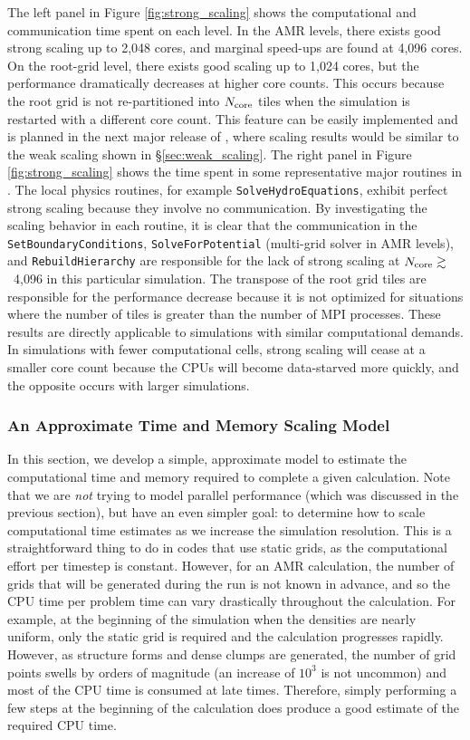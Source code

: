 The left panel in Figure \ref{fig:strong_scaling} shows the
computational and communication time spent on each level.  In the AMR
levels, there exists good strong scaling up to 2,048 cores, and
marginal speed-ups are found at 4,096 cores.  On the root-grid level,
there exists good scaling up to 1,024 cores, but the performance
dramatically decreases at higher core counts.  This occurs because the
root grid is not re-partitioned into $N_{\rm core}$ tiles when the
simulation is restarted with a different core count.  This feature can
be easily implemented and is planned in the next major release of
\enzo, where scaling results would be similar to the weak scaling shown
in \S\ref{sec:weak_scaling}.  The right panel in Figure
\ref{fig:strong_scaling} shows the time spent in some representative
major routines in \enzo.  The local physics routines, for example
\texttt{SolveHydroEquations}, exhibit perfect strong scaling because
they involve no communication.  By investigating the scaling behavior
in each routine, it is clear that the communication in the
\texttt{SetBoundaryConditions}, \texttt{SolveForPotential} (multi-grid
solver in AMR levels), and \texttt{RebuildHierarchy} are responsible
for the lack of strong scaling at $N_{\rm core} \gtrsim$~4,096 in this
particular simulation.  The transpose of the root grid tiles are
responsible for the performance decrease because it is not optimized
for situations where the number of tiles is greater than the number of
MPI processes.  These results are directly applicable to simulations
with similar computational demands.  In simulations with fewer
computational cells, strong scaling will cease at a smaller core count
because the CPUs will become data-starved more quickly, and the
opposite occurs with larger simulations.


\subsubsection{An Approximate Time and Memory Scaling Model}

In this section, we develop a simple, approximate model to estimate
the computational time and memory required to complete a given
calculation.  Note that we are {\it not} trying to model parallel
performance (which was discussed in the previous section), but have an
even simpler goal: to determine how to scale computational time
estimates as we increase the simulation resolution.  This is a
straightforward thing to do in codes that use static grids, as the
computational effort per timestep is constant.  However, for an AMR
calculation, the number of grids that will be generated during the run
is not known in advance, and so the CPU time per problem time can vary
drastically throughout the calculation.  For example, at the beginning
of the simulation when the densities are nearly uniform, only the
static grid is required and the calculation progresses rapidly.
However, as structure forms and dense clumps are generated, the number
of grid points swells by orders of magnitude (an increase of $10^3$ is
not uncommon) and most of the CPU time is consumed at late times.
Therefore, simply performing a few steps at the beginning of the
calculation does produce a good estimate of the required CPU time.


